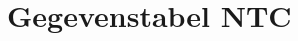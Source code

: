 \documentclass[12pt,a4paper,final,twoside,fleqn]{article}
\newcommand{\rntc}{R_\text{NTC}}
\begin{document}

\appendix

\clearpage
\section{Gegevenstabel NTC}
\end{document}
